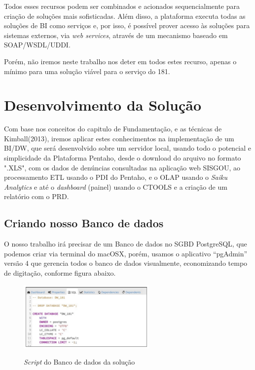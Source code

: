 Todos esses recursos podem ser combinados e acionados sequencialmente para cria\c{c}\~{a}o de solu\c{c}\~{o}es mais sofisticadas. Al\'{e}m disso, a plataforma executa todas as solu\c{c}\~{o}es de BI como servi\c{c}os e, por isso, \'{e} possível prover acesso \`{a}s solu\c{c}\~{o}es para sistemas externos, via \textit{web services}, atrav\'{e}s de um mecanismo baseado em SOAP/WSDL/UDDI.

Por\'{e}m, n\~{a}o iremos neste trabalho nos deter em todos estes recurso, apenas o mínimo para uma solu\c{c}\~{a}o vi\'{a}vel para o servi\c{c}o do 181.


\section{Desenvolvimento da Solu\c{c}\~{a}o}

Com base nos conceitos do capitulo de Fundamenta\c{c}\~{a}o, e as t\'{e}cnicas de Kimball(2013), iremos aplicar estes conhecimentos na implementa\c{c}\~{a}o de um BI/DW, que ser\'{a} desenvolvido sobre um servidor local, usando todo o potencial e simplicidade da Plataforma Pentaho, desde o download do arquivo no formato ".XLS", com os dados de denúncias consultadas na aplica\c{c}\~{a}o web SISGOU, ao processamento ETL usando o PDI do Pentaho, e o OLAP usando o \textit{Saiku Analytics} e at\'{e} o \textit{dashboard} (painel) usando o CTOOLS e a cria\c{c}\~{a}o de um relat\'orio com o PRD.

\subsection{Criando nosso Banco de dados}

O nosso trabalho ir\'{a} precisar de um Banco de dados no SGBD PostgreSQL, que podemos criar via terminal do macOSX, por\'{e}m, usamos o aplicativo ``pgAdmin'' vers\~{a}o 4 que gerencia todos o banco de dados visualmente, economizando tempo de digita\c{c}\~{a}o, conforme figura abaixo.

\begin{figure}[H]
	\vspace*{0,2cm}
    \centering
    \caption{\textit{Script} do Banco de dados da solu\c{c}\~{a}o}
    \includegraphics[width=0.6\textwidth]{./04-figuras/figura-16}
    \label{fig:ilustfig16}
\end{figure}
\vspace*{-0,9cm}
{\raggedright {}} \\

